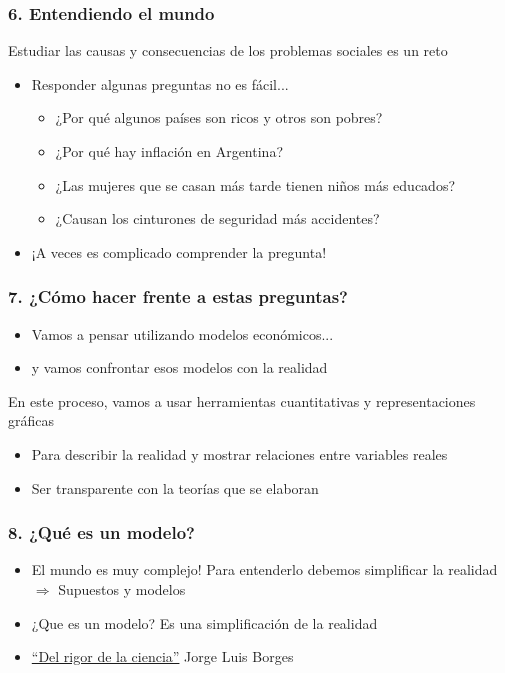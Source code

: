 \documentclass{beamer}
\begin{document}
\begin{frame}
\frametitle{6. Entendiendo el mundo}
Estudiar las causas y consecuencias de los problemas sociales es un reto 
\begin{itemize}
    \item Responder algunas preguntas no es fácil...
    \begin{itemize}
        \item ¿Por qué algunos países son ricos y otros son pobres?
        \item ¿Por qué hay inflación en Argentina?
        \item ¿Las mujeres que se casan más tarde tienen niños más educados?
        \item ¿Causan los cinturones de seguridad más accidentes?
        \end{itemize}
    \item ¡A veces es complicado comprender la pregunta!
\end{itemize}
\end{frame}

\begin{frame}
\frametitle{7. ¿Cómo hacer frente a estas preguntas?}
    \begin{itemize}
            \item Vamos a pensar utilizando modelos económicos... \vspace{2mm}
            \item y vamos confrontar esos modelos con la realidad
    \end{itemize} \vspace{2mm}
En este proceso, vamos a usar herramientas cuantitativas y representaciones gráficas \vspace{2mm}
    \begin{itemize}
        \item Para describir la realidad y mostrar relaciones entre variables reales
        \item Ser transparente con la teorías que se elaboran
        \end{itemize}
\end{frame}

\begin{frame}
\frametitle{8. ¿Qué es un modelo?}
\begin{itemize}
    \item El mundo es muy complejo! Para entenderlo debemos simplificar la realidad \vspace{2mm} \\ $\Rightarrow$
    Supuestos y modelos \vspace{2mm}
    \item ¿Que es un modelo? Es una simplificación de la realidad \vspace{2mm}
    \item  \href{https://www.youtube.com/watch?v=zwDA3GmcwJU}{``Del rigor de la ciencia''} 
    Jorge Luis Borges
\end{itemize}
\end{frame}
\end{document}
